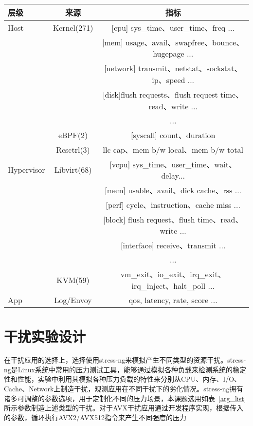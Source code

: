 \begin{table}
    \label{tab:metric_list}
    \footnotesize%
    \setlength{\tabcolsep}{4pt}%
    \renewcommand{\arraystretch}{1.5}%
    \centering
    \begin{tabular}{lcc}
        \hline
        层级 & 来源 & 指标\\
        \hline
        Host & Kernel(271) & [cpu] sys_time、user_time、freq ... \\
        & & [mem] usage、avail、swapfree、bounce、hugepage ...\\
        & & [network] transmit、netstat、sockstat、ip、speed ...\\
        & & [disk]flush requests、flush request time、read、write ...\\
        & & ...\\
        & eBPF(2) & [syscall] count、duration\\
        & Resctrl(3) & llc cap、mem b/w local、mem b/w total\\
        Hypervisor & Libvirt(68) & [vcpu] sys_time、user_time、wait、delay...\\
        & & [mem] usable、avail、dick cache、rss ...\\
        & & [perf] cycle、instruction、cache miss ...\\
        & & [block] flush request、flush time、read、write ...\\
        & & [interface] receive、transmit ...\\
        & & ...\\
        & KVM(59) & vm_exit、io_exit、irq_exit、irq_inject、halt_poll ...\\
        App & Log/Envoy & qos, latency, rate, score ...\\
        \hline
    \end{tabular}
\end{table}

\section{干扰实验设计}


在干扰应用的选择上，选择使用stress-ng来模拟产生不同类型的资源干扰。stress-ng是Linux系统中常用的压力测试工具，能够通过模拟各种负载来检测系统的稳定性和性能，实验中利用其模拟各种压力负载的特性来分别从CPU、内存、I/O、Cache、Network上制造干扰，观测应用在不同干扰下的劣化情况。stress-ng拥有诸多可调整的参数选项，用于定制化不同的压力场景，本课题选用如表~\ref{arg_list}所示参数制造上述类型的干扰。对于AVX干扰应用通过开发程序实现，根据传入的参数，循环执行AVX2/AVX512指令来产生不同强度的压力

